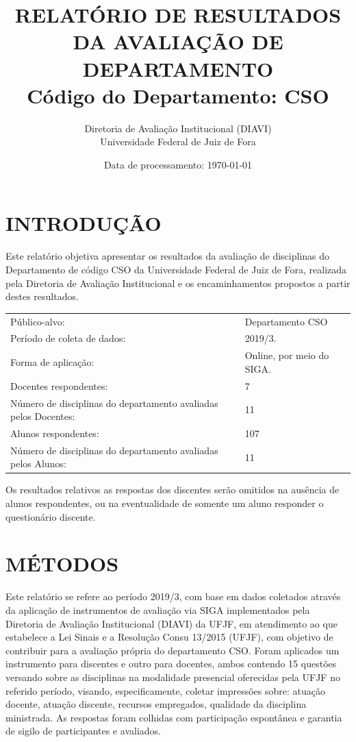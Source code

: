 \documentclass[a4paper,10pt]{article}
\date{Data de processamento: \today}
\begin{document}
\author{Diretoria de Avaliação Institucional (DIAVI) \\ Universidade Federal de Juiz de Fora}

\title{RELATÓRIO DE RESULTADOS DA AVALIAÇÃO DE DEPARTAMENTO\\ Código do Departamento: CSO}
\maketitle
\section{INTRODUÇÃO}
Este relatório objetiva apresentar os resultados da avaliação de disciplinas do Departamento     de código CSO da Universidade Federal de Juiz de Fora, realizada pela     Diretoria de Avaliação Institucional e os encaminhamentos propostos a     partir destes resultados.

\begin{center}
\begin{tabularx}{\linewidth}{X|l}

Público-alvo:& Departamento  CSO\\

Período de coleta de dados:& 2019/3.\\

Forma de aplicação:& Online, por meio do SIGA.\\

Docentes respondentes:& 7\\

Número de disciplinas do departamento avaliadas pelos Docentes:& 11\\

Alunos   respondentes:& 107\\

Número de disciplinas do departamento  avaliadas pelos   Alunos:& 11\\
\end{tabularx}
\end{center}

Os resultados relativos as respostas dos discentes serão omitidos na ausência de alunos respondentes, ou na eventualidade de somente um aluno responder o questionário discente.
\section{MÉTODOS}
Este relatório se refere ao período 2019/3, com base em dados     coletados através da aplicação de instrumentos de avaliação via SIGA     implementados pela Diretoria de Avaliação Institucional (DIAVI) da UFJF, em atendimento     ao que estabelece a Lei Sinais e a Resolução Consu 13/2015 (UFJF),     com objetivo de contribuir para a avaliação própria do departamento CSO.    Foram aplicados um instrumento para discentes e outro para docentes, ambos contendo     15 questões versando sobre as disciplinas na modalidade presencial oferecidas pela UFJF no     referido período, visando, especificamente, coletar impressões sobre: atuação docente, atuação discente,     recursos empregados, qualidade da disciplina ministrada.     As respostas foram colhidas      com participação espontânea e garantia de    sigilo de participantes e avaliados.
\end{document}
